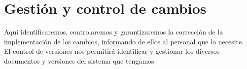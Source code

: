 \documentclass[spanish,a4paper,12pt]{report}	%
\begin{document}
	\section{Gestión y control de cambios}
Aquí identificaremos, controlaremos y garantizaremos la corrección de la implementación de los cambios, informando de ellos al personal que lo necesite.
El control de versiones nos permitirá identificar y gestionar los diversos documentos y versiones del sistema que tengamos


\newpage
\mbox{}
\thispagestyle{empty}						%
\newpage


\newpage
\mbox{}
\thispagestyle{empty}						%
\newpage
\end{document}
